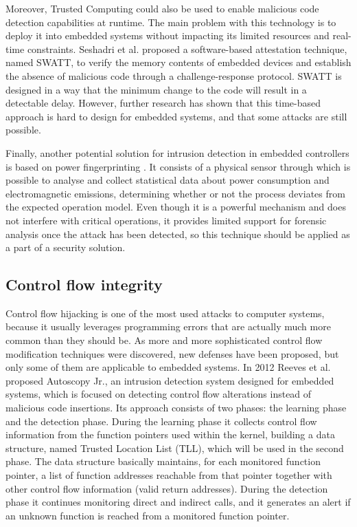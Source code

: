 Moreover, Trusted Computing could also be used to enable malicious code detection capabilities at runtime. The main problem with this technology is to deploy it into
embedded systems without impacting its limited resources and real-time constraints. Seshadri et al. \cite{swatt} proposed a software-based attestation technique,
named SWATT, to verify the memory contents of embedded devices and establish the absence of malicious code through a challenge-response protocol.
SWATT is designed in a way that the minimum change to the code will result in a detectable delay. However, further research \cite{swatt-difficulty} has shown that
this time-based approach is hard to design for embedded systems, and that some attacks are still possible.

Finally, another potential solution for intrusion detection in embedded controllers is based on power fingerprinting \cite{power-fingerprinting}.
It consists of a physical sensor through which is possible to analyse and collect statistical data about power consumption and electromagnetic emissions,
determining whether or not the process deviates from the expected operation model. Even though it is a powerful mechanism and does not interfere with critical operations,
it provides limited support for forensic analysis once the attack has been detected, so this technique should be applied as a part of a security solution.


\subsection{Control flow integrity}

Control flow hijacking is one of the most used attacks to computer systems, because it usually leverages programming errors that are actually much more common than they should be.
As more and more sophisticated control flow modification techniques were discovered, new defenses have been proposed, but only some of them are applicable to embedded systems.
In 2012 Reeves et al. \cite{autoscopy} proposed Autoscopy Jr., an intrusion detection system designed for embedded systems, which is focused on detecting
control flow alterations instead of malicious code insertions. Its approach consists of two phases: the learning phase and the detection phase.
During the learning phase it collects control flow information from the function pointers used within the kernel,
building a data structure, named Trusted Location List (TLL), which will be used in the second phase.
The data structure basically maintains, for each monitored function pointer, a list of function addresses reachable from that pointer together
with other control flow information (\eg valid return addresses). During the detection phase it continues monitoring direct and indirect calls,
and it generates an alert if an unknown function is reached from a monitored function pointer.

